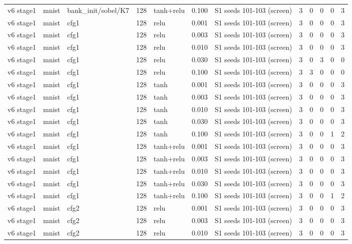 \begin{table}[htbp]
{\begin{tabular}{@{}lllrlrlrrrrr@{}}
v6 stage1 & mnist & bank\_init/sobel/K7 & 128 & tanh+relu & 0.100 & S1 seeds 101-103 (screen) & 3 & 0 & 0 & 0 & 3 \\
v6 stage1 & mnist & cfg1 & 128 & relu & 0.001 & S1 seeds 101-103 (screen) & 3 & 0 & 0 & 0 & 3 \\
v6 stage1 & mnist & cfg1 & 128 & relu & 0.003 & S1 seeds 101-103 (screen) & 3 & 0 & 0 & 0 & 3 \\
v6 stage1 & mnist & cfg1 & 128 & relu & 0.010 & S1 seeds 101-103 (screen) & 3 & 0 & 0 & 0 & 3 \\
v6 stage1 & mnist & cfg1 & 128 & relu & 0.030 & S1 seeds 101-103 (screen) & 3 & 0 & 3 & 0 & 0 \\
v6 stage1 & mnist & cfg1 & 128 & relu & 0.100 & S1 seeds 101-103 (screen) & 3 & 3 & 0 & 0 & 0 \\
v6 stage1 & mnist & cfg1 & 128 & tanh & 0.001 & S1 seeds 101-103 (screen) & 3 & 0 & 0 & 0 & 3 \\
v6 stage1 & mnist & cfg1 & 128 & tanh & 0.003 & S1 seeds 101-103 (screen) & 3 & 0 & 0 & 0 & 3 \\
v6 stage1 & mnist & cfg1 & 128 & tanh & 0.010 & S1 seeds 101-103 (screen) & 3 & 0 & 0 & 0 & 3 \\
v6 stage1 & mnist & cfg1 & 128 & tanh & 0.030 & S1 seeds 101-103 (screen) & 3 & 0 & 0 & 0 & 3 \\
v6 stage1 & mnist & cfg1 & 128 & tanh & 0.100 & S1 seeds 101-103 (screen) & 3 & 0 & 0 & 1 & 2 \\
v6 stage1 & mnist & cfg1 & 128 & tanh+relu & 0.001 & S1 seeds 101-103 (screen) & 3 & 0 & 0 & 0 & 3 \\
v6 stage1 & mnist & cfg1 & 128 & tanh+relu & 0.003 & S1 seeds 101-103 (screen) & 3 & 0 & 0 & 0 & 3 \\
v6 stage1 & mnist & cfg1 & 128 & tanh+relu & 0.010 & S1 seeds 101-103 (screen) & 3 & 0 & 0 & 0 & 3 \\
v6 stage1 & mnist & cfg1 & 128 & tanh+relu & 0.030 & S1 seeds 101-103 (screen) & 3 & 0 & 0 & 0 & 3 \\
v6 stage1 & mnist & cfg1 & 128 & tanh+relu & 0.100 & S1 seeds 101-103 (screen) & 3 & 0 & 0 & 1 & 2 \\
v6 stage1 & mnist & cfg2 & 128 & relu & 0.001 & S1 seeds 101-103 (screen) & 3 & 0 & 0 & 0 & 3 \\
v6 stage1 & mnist & cfg2 & 128 & relu & 0.003 & S1 seeds 101-103 (screen) & 3 & 0 & 0 & 0 & 3 \\
v6 stage1 & mnist & cfg2 & 128 & relu & 0.010 & S1 seeds 101-103 (screen) & 3 & 0 & 0 & 0 & 3 \\

\end{tabular}}
\end{table}

